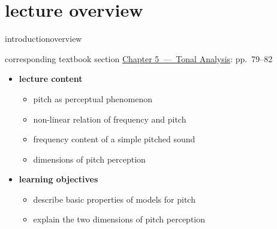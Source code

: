 




\subtitle{Module 5.0: Human Perception of Pitch}


	

    \section[overview]{lecture overview}
        \begin{frame}{introduction}{overview}
            \begin{block}{corresponding textbook section}
                    \href{http://ieeexplore.ieee.org/xpl/articleDetails.jsp?arnumber=6331122}{Chapter 5~---~Tonal Analysis}: pp.~79--82
            \end{block}

            \begin{itemize}
                \item   \textbf{lecture content}
                    \begin{itemize}
                        \item   pitch as perceptual phenomenon 
                        \item   non-linear relation of frequency and pitch
                        \item   frequency content of a simple pitched sound
                        \item   dimensions of pitch perception
                    \end{itemize}
                \bigskip
                \item<2->   \textbf{learning objectives}
                    \begin{itemize}
                        \item   describe basic properties of models for pitch
                        \item   explain the two dimensions of pitch perception
                    \end{itemize}
            \end{itemize}
        \end{frame}

